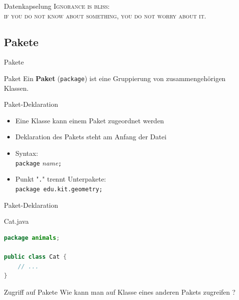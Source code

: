 \documentclass[18pt]{beamer}
\begin{document}
\begin{frame}{Datenkapselung}
    \textsc{\LARGE{Ignorance is bliss:}}\\
    \textsc{if you do not know about something, you do not worry about it.}
\end{frame}


\subsection{Pakete}

\begin{frame}{Pakete}
    \begin{block}{Paket}
        Ein \textbf{Paket} (\texttt{package}) ist eine Gruppierung von zusammengehörigen Klassen.
    \end{block}
\end{frame}

\begin{frame}{Paket-Deklaration}

    \begin{itemize}
        \item Eine Klasse kann einem Paket zugeordnet werden
        \item Deklaration des Pakets steht am Anfang der Datei
        \item Syntax:\\ \texttt{package} \textit{name}\texttt{;}
        \item Punkt "\texttt{.}" trennt Unterpakete:\\ \texttt{package edu.kit.geometry;}
    \end{itemize}
\end{frame}

\begin{frame}[fragile]{Paket-Deklaration}
    \begin{exampleblock}{Cat.java}
        \begin{lstlisting}[language=Java]
package animals;

public class Cat {
    // ...
}
        \end{lstlisting}

    \end{exampleblock}

\end{frame}



\begin{frame}{Zugriff auf Pakete}
    Wie kann man auf Klasse eines anderen Pakets zugreifen ?
\end{frame}
\end{document}

